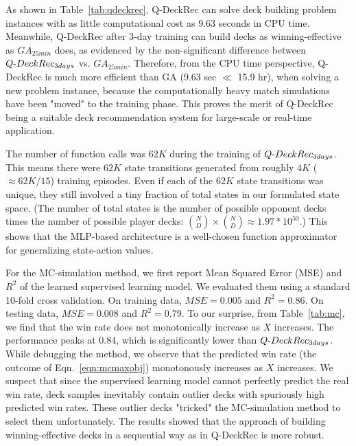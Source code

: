 
As shown in Table~\ref{tab:qdeckrec}, Q-DeckRec can solve deck building problem instances with as little computational cost as 9.63 seconds in CPU time. Meanwhile, Q-DeckRec after 3-day training can build decks as winning-effective as $GA_{25min}$ does, as evidenced by the non-significant difference between $Q\textnormal{-}DeckRec_{ 3days}$ vs. $GA_{25min}$. Therefore, from the CPU time perspective, Q-DeckRec is much more efficient than GA ({9.63 sec $\ll$ 15.9 hr}), when solving a new problem instance, because the computationally heavy match simulations have been "moved" to the training phase. This proves the merit of Q-DeckRec being a suitable deck recommendation system for large-scale or real-time application. 

The number of function calls was $62K$ during the training of $Q\textnormal{-}DeckRec_{3days}$. This means there were $62K$ state transitions generated from roughly $4K$ ($\approx 62K/15$) training episodes. Even if each of the $62K$ state transitions was unique, they still involved a tiny fraction of total states in our formulated state space. (The number of total states is the number of possible opponent decks times the number of possible player decks: ${N\choose D} \times {N\choose D} \approx 1.97 * 10^{50}$.) This shows that the MLP-based architecture is a well-chosen function approximator for generalizing state-action values.    


For the MC-simulation method, we first report Mean Squared Error (MSE) and $R^2$ of the learned supervised learning model. We evaluated them using a standard 10-fold cross validation. On training data, $MSE=0.005$ and $R^2=0.86$. On testing data, $MSE=0.008$ and $R^2=0.79$. To our surprise, from Table~\ref{tab:mc}, we find that the win rate does not monotonically increase as $X$ increases. The performance peaks at 0.84, which is significantly lower than $Q\textnormal{-}DeckRec_{3days}$. While debugging the method, we observe that the predicted win rate (the outcome of Eqn.~\ref{eqn:mcmaxobj}) monotonously increases as $X$ increases. We suspect that since the supervised learning model cannot perfectly predict the real win rate, deck samples inevitably contain outlier decks with spuriously high predicted win rates. These outlier decks "tricked" the MC-simulation method to select them unfortunately. The results showed that the approach of building winning-effective decks in a sequential way as in Q-DeckRec is more robust.



